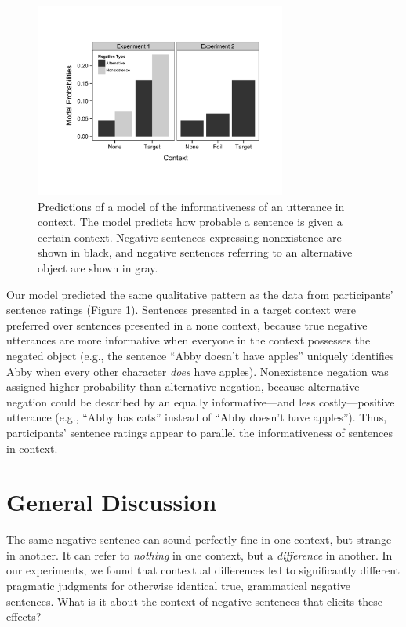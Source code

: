 \documentclass[10pt,letterpaper]{article}
\begin{document}
\begin{figure}[t]
\begin{center} 
\includegraphics[width=3.25in]{figures/model_predictions.pdf}
\caption{\label{fig:model} Predictions of a model of the informativeness of an utterance in context.  The model predicts how probable a sentence is given a certain context.  Negative sentences expressing nonexistence are shown in black, and negative sentences referring to an alternative object are shown in gray.}
\end{center} 
\end{figure}

Our model predicted the same qualitative pattern as the data from participants' sentence ratings (Figure \ref{fig:model}).  Sentences presented in a target context were preferred over sentences presented in a none context, because true negative utterances are more informative when everyone in the context possesses the negated object (e.g., the sentence ``Abby doesn't have apples'' uniquely identifies Abby when every other character \emph{does} have apples).  Nonexistence negation was assigned higher probability than alternative negation, because alternative negation could be described by an equally informative---and less costly---positive utterance (e.g., ``Abby has cats'' instead of ``Abby doesn't have apples'').  Thus, participants' sentence ratings appear to parallel the informativeness of sentences in context.  

\section{General Discussion}

The same negative sentence can sound perfectly fine in one context, but strange in another.  It can refer to \emph{nothing} in one context, but a \emph{difference} in another. In our experiments, we found that contextual differences led to significantly different pragmatic judgments for otherwise identical true, grammatical negative sentences. What is it about the context of negative sentences that elicits these effects?  
\end{document}
